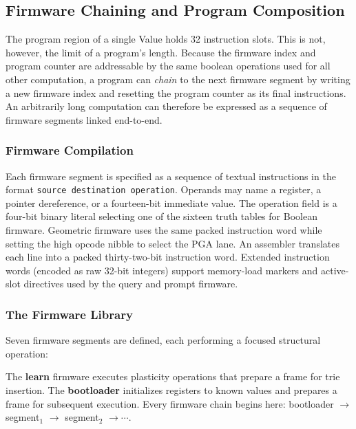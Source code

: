 \subsection{Firmware Chaining and Program Composition}
\label{sec:firmware}

The program region of a single Value holds 32 instruction slots.  This
is not, however, the limit of a program's length.  Because the firmware
index and program counter are addressable by the same boolean operations
used for all other computation, a program can \emph{chain} to the next
firmware segment by writing a new firmware index and resetting the
program counter as its final instructions.  An arbitrarily long
computation can therefore be expressed as a sequence of firmware
segments linked end-to-end.

\subsubsection{Firmware Compilation}

Each firmware segment is specified as a sequence of textual instructions
in the format \texttt{source destination operation}.  Operands may name
a register, a pointer dereference, or a fourteen-bit immediate value.
The operation field is a four-bit binary literal selecting one of the
sixteen truth tables for Boolean firmware.  Geometric firmware uses the
same packed instruction word while setting the high opcode nibble to
select the PGA lane.  An assembler translates each line into a packed
thirty-two-bit instruction word.  Extended instruction words (encoded as
raw 32-bit integers) support memory-load markers and active-slot
directives used by the query and prompt firmware.

\subsubsection{The Firmware Library}

Seven firmware segments are defined, each performing a focused
structural operation:

The \textbf{learn} firmware executes plasticity operations that prepare
a frame for trie insertion.  The \textbf{bootloader} initializes
registers to known values and prepares a frame for subsequent execution.
Every firmware chain begins here: bootloader $\to$ segment$_1$ $\to$
segment$_2$ $\to \cdots$.

